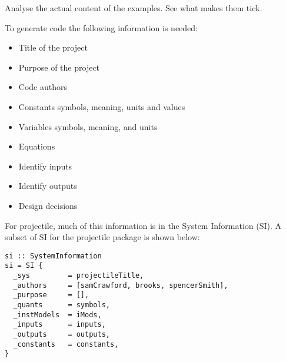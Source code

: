 \documentclass[english,submission]{programming}
\begin{document}
Analyse the actual content of the examples. See what makes them tick.

To generate code the following information is needed:

\begin{itemize}
  \item Title of the project %
  \item Purpose of the project %
  \item Code authors
  \item Constants symbols, meaning, units and values
  \item Variables symbols, meaning, and units
  \item Equations
  \item Identify inputs
  \item Identify outputs
  \item Design decisions
\end{itemize}

For projectile, much of this information is in the System Information (SI).  A
subset of SI for the projectile package is shown below:

\begin{lstlisting}
si :: SystemInformation
si = SI {
  _sys         = projectileTitle,
  _authors     = [samCrawford, brooks, spencerSmith],
  _purpose     = [],
  _quants      = symbols,
  _instModels  = iMods,
  _inputs      = inputs,
  _outputs     = outputs,
  _constants   = constants,
}
\end{lstlisting}



\end{document}
